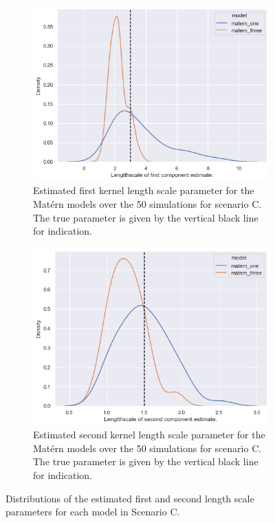 \begin{figure}
	\centering
	\begin{subfigure}[b]{0.45\textwidth}
		\includegraphics[width=\textwidth]{rho_1_param_C}
		\caption{Estimated first kernel length scale parameter for the Mat\'ern models over the 50 simulations for scenario C. The true parameter is given by the vertical black line for indication.}
		\label{fig:rho_1_param_C}
	\end{subfigure}
	\hfill
	\begin{subfigure}[b]{0.45\textwidth}
		\includegraphics[width=\textwidth]{rho_2_param_C}
		\caption{Estimated second kernel length scale parameter for the Mat\'ern models over the 50 simulations for scenario C. The true parameter is given by the vertical black line for indication.}
		\label{fig:rho_2_param_C}
	\end{subfigure}
	\caption[Distributions of the estimated first and second length scale parameters for each model in Scenario C.]{Distributions of the estimated first and second length scale parameters for each model in Scenario C.}
	\label{fig:rho_param_C}
\end{figure}

